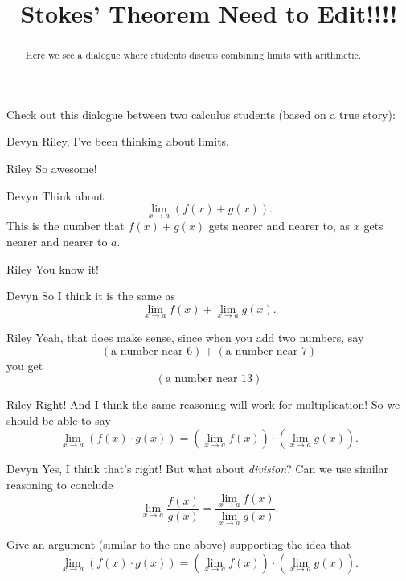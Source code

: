 \documentclass{ximera}
\title[Break-Ground:]{Stokes' Theorem Need to Edit!!!!}
\begin{document}
\begin{abstract}
Here we see a dialogue where students discuss combining limits with
arithmetic.
\end{abstract}
\maketitle


Check out this dialogue between two calculus students (based on a true
story):

\begin{dialogue}
\item[Devyn] Riley, I've been thinking about limits.
\item[Riley] So awesome!
\item[Devyn] Think about
  \[
  \displaystyle\lim_{x\to a} \left(f(x) + g(x)\right).
  \]
  This is the number that $f(x) + g(x)$ gets nearer and nearer to, as $x$ gets nearer and nearer to $a$. 
\item[Riley] You know it!
\item[Devyn] So I think it is the same as
  \[
  \displaystyle\lim_{x\to a} f(x) + \displaystyle\lim_{x\to a}g(x).
  \]
\item[Riley] Yeah, that does make sense, since when you add two
  numbers, say
  \[
  (\text{a number near $6$}) + (\text{a number near $7$})
  \]
  you get
  \[
  (\text{a number near $13$})
  \]
\item[Riley] Right! And I think the same reasoning will work for
  multiplication! So we should be able to say
  \[
  \displaystyle\lim_{x\to a}\left(f(x) \cdot g(x)\right) = \left(\displaystyle\lim_{x\to a} f(x) \right)\cdot\left(\displaystyle\lim_{x\to a} g(x)\right).
  \]
\item[Devyn] Yes, I think that's right! But what about
  \textit{division}? Can we use similar reasoning to conclude
  \[
  \displaystyle\lim_{x\to a} \frac{f(x)}{g(x)} = \frac{\displaystyle\lim_{x\to a}
    f(x)}{\displaystyle\lim_{x\to a} g(x)}.
  \]
\end{dialogue}



\begin{problem}
  Give an argument (similar to the one above) supporting the idea that
  \[
  \displaystyle\lim_{x\to a}\left(f(x) \cdot g(x)\right) = \left(\displaystyle\lim_{x\to a} f(x) \right)\cdot\left(\displaystyle\lim_{x\to a} g(x)\right).
  \]
  \begin{freeResponse}
  \end{freeResponse}
\end{problem}
\end{document}
